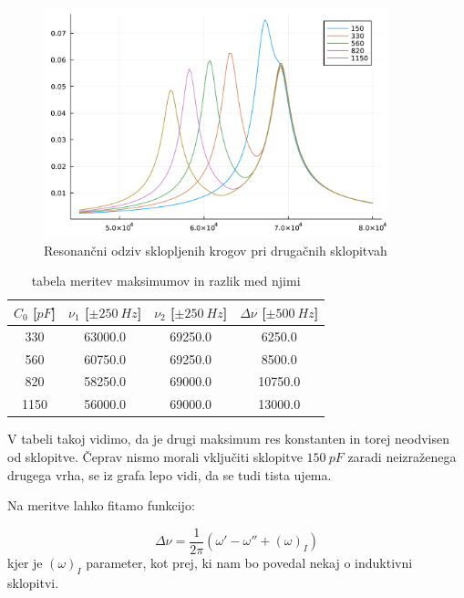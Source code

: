 \documentclass[12pt]{article}
\begin{document}
\begin{figure}[ht]
\begin{center}
    \includegraphics[width=10cm]{multi.pdf}
    \caption{Resonančni odziv sklopljenih krogov pri drugačnih sklopitvah}
\end{center}
\end{figure}

\begin{table}[!ht]
\centering
\begin{tabular}{c|c|c|c}
$C_0$ [$pF$] & $\nu_1$ [$\pm 250\ Hz$] & $\nu_2$ [$\pm 250\ Hz$] & $\Delta \nu$ [$\pm 500\ Hz$] \\\hline
  330 & 63000.0 & 69250.0 & 6250.0 \\
  560 & 60750.0 & 69250.0 & 8500.0 \\
  820 & 58250.0 & 69000.0 & 10750.0 \\
  1150 & 56000.0 & 69000.0 & 13000.0 \\
\end{tabular}
\caption{tabela meritev maksimumov in razlik med njimi}
\end{table}
\newpage
\noindent V tabeli takoj vidimo, da je drugi maksimum res konstanten in torej neodvisen od sklopitve. Čeprav nismo morali vključiti sklopitve $150\ pF$ zaradi neizraženega drugega vrha, se iz grafa lepo vidi, da se tudi tista ujema. 

Na meritve lahko fitamo funkcijo:

$$
\Delta \nu = \frac{1}{2\pi}(\omega' - \omega '' + (\omega)_I)
$$
kjer je $(\omega)_I$ parameter, kot prej, ki nam bo povedal nekaj o induktivni sklopitvi.
\end{document}
